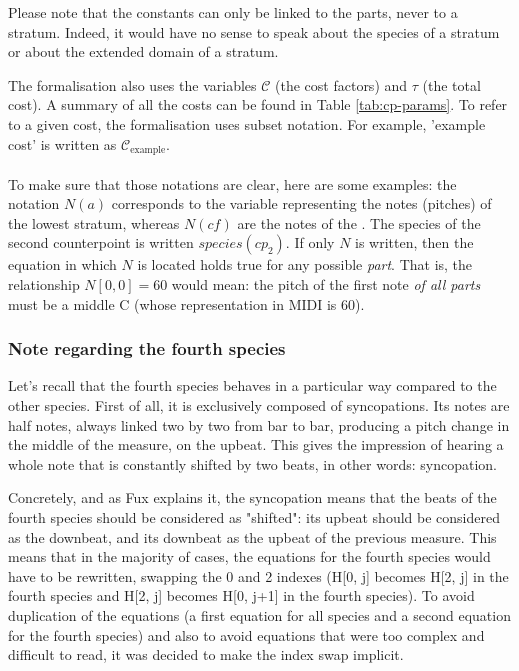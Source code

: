 Please note that the constants can only be linked to the parts, never to a stratum. Indeed, it would have no sense to speak about the species of a stratum or about the extended domain of a stratum.

The formalisation also uses the variables $\mathcal{C}$ (the cost factors) and $\tau$ (the total cost). A summary of all the costs can be found in Table \ref{tab:cp-params}. To refer to a given cost, the formalisation uses subset notation. For example, 'example cost' is written as $\mathcal{C}_{\text{example}}$.

\paragraph{}
To make sure that those notations are clear, here are some examples: the notation $N(a)$ corresponds to the variable representing the notes (pitches) of the lowest stratum, whereas $N(\mathit{cf})$ are the notes of the \cf. The species of the second counterpoint is written $species(cp_2)$. If only $N$ is written, then the equation in which $N$ is located holds true for any possible \textit{part}. That is, the relationship $N[0, 0] = 60$ would mean: the pitch of the first note \textit{of all parts} must be a middle C (whose representation in MIDI is 60).

\subsubsection{Note regarding the fourth species}\label{nota-bene-4th-species} Let's recall that the fourth species behaves in a particular way compared to the other species. First of all, it is exclusively composed of syncopations. Its notes are half notes, always linked two by two from bar to bar, producing a pitch change in the middle of the measure, on the upbeat. This gives the impression of hearing a whole note that is constantly shifted by two beats, in other words: syncopation.

Concretely, and as Fux explains it, the syncopation means that the beats of the fourth species should be considered as "shifted": its upbeat should be considered as the downbeat, and its downbeat as the upbeat of the previous measure. This means that in the majority of cases, the equations for the fourth species would have to be rewritten, swapping the 0 and 2 indexes (H[0, j] becomes H[2, j] in the fourth species and H[2, j] becomes H[0, j+1] in the fourth species). To avoid duplication of the equations (a first equation for all species and a second equation for the fourth species) and also to avoid equations that were too complex and difficult to read, it was decided to make the index swap implicit.

